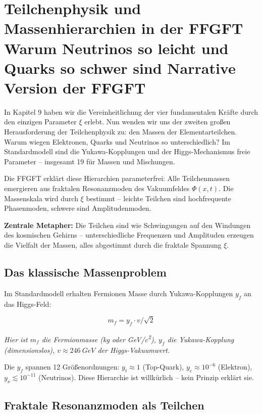 \chapter{Teilchenphysik und Massenhierarchien in der FFGFT  Warum Neutrinos so leicht und Quarks so schwer sind  Narrative Version der FFGFT}


	
	In Kapitel 9 haben wir die Vereinheitlichung der vier fundamentalen Kräfte durch den einzigen Parameter \(\xi\) erlebt. Nun wenden wir uns der zweiten großen Herausforderung der Teilchenphysik zu: den Massen der Elementarteilchen. Warum wiegen Elektronen, Quarks und Neutrinos so unterschiedlich? Im Standardmodell sind die Yukawa-Kopplungen und der Higgs-Mechanismus freie Parameter – insgesamt 19 für Massen und Mischungen.
	
	Die FFGFT erklärt diese Hierarchien parameterfrei: Alle Teilchenmassen emergieren aus fraktalen Resonanzmoden des Vakuumfeldes \(\Phi(x,t)\). Die Massenskala wird durch \(\xi\) bestimmt – leichte Teilchen sind hochfrequente Phasenmoden, schwere sind Amplitudenmoden.
	
	\textbf{Zentrale Metapher:} Die Teilchen sind wie Schwingungen auf den Windungen des kosmischen Gehirns – unterschiedliche Frequenzen und Amplituden erzeugen die Vielfalt der Massen, alles abgestimmt durch die fraktale Spannung \(\xi\).
	
	\section{Das klassische Massenproblem}
	
	Im Standardmodell erhalten Fermionen Masse durch Yukawa-Kopplungen \(y_f\) an das Higgs-Feld:
	
	\begin{equation}
		m_f = y_f \cdot v / \sqrt{2}
	\end{equation}
	
	\textit{Hier ist \(m_f\) die Fermionmasse (kg oder \si{GeV/c^2}), \(y_f\) die Yukawa-Kopplung (dimensionslos), \(v \approx \SI{246}{GeV}\) der Higgs-Vakuumwert.}
	
	Die \(y_f\) spannen 12 Größenordnungen: \(y_t \approx 1\) (Top-Quark), \(y_e \approx 10^{-6}\) (Elektron), \(y_\nu \lesssim 10^{-11}\) (Neutrinos). Diese Hierarchie ist willkürlich – kein Prinzip erklärt sie.
	
	\section{Fraktale Resonanzmoden als Teilchen}
	
